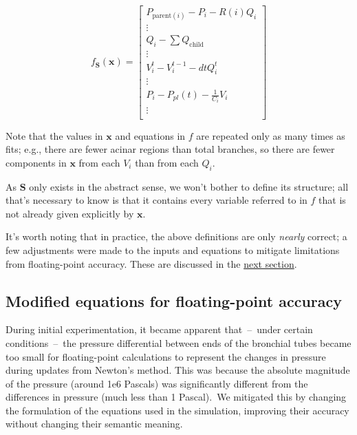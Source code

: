 \begin{equation*}
    f_{\bm{S}}(\bm{x}) =
        \begin{bmatrix}
            P_{\text{parent}(i)} - P_i - R(i)Q_i \\
            \vdots \\
            Q_i - \sum Q_{\text{child}} \\
            \vdots \\
            V_i^t - V_i^{t-1} - dtQ_i^t \\
            \vdots \\
            P_i - P_{pl}(t) - \frac{1}{C_i} V_i \\
            \vdots \\
        \end{bmatrix}
\end{equation*}

Note that the values in $\bm{x}$ and equations in $f$ are repeated only as many times as fits; e.g.,
there are fewer acinar regions than total branches, so there are fewer components in $\bm{x}$ from
each $V_i$ than from each $Q_i$.

As $\bm{S}$ only exists in the abstract sense, we won't bother to define its structure; all that's
necessary to know is that it contains every variable referred to in $f$ that is not already given
explicitly by $\bm{x}$.

\breakpars

It's worth noting that in practice, the above definitions are only \textit{nearly} correct; a few
adjustments were made to the inputs and equations to mitigate limitations from floating-point
accuracy. These are discussed in the \hyperref[sec:modified-equations]{next section}.

\subsection{Modified equations for floating-point accuracy} \label{sec:modified-equations}

During initial experimentation, it became apparent that~--~under certain conditions~--~the pressure
differential between ends of the bronchial tubes became too small for floating-point calculations to
represent the changes in pressure during updates from Newton's method. This was because the absolute
magnitude of the pressure (around 1e6 Pascals) was significantly different from the differences in
pressure (much less than 1 Pascal).\footnotemark\ We mitigated this by changing the formulation of
the equations used in the simulation, improving their accuracy without changing their semantic
meaning.

